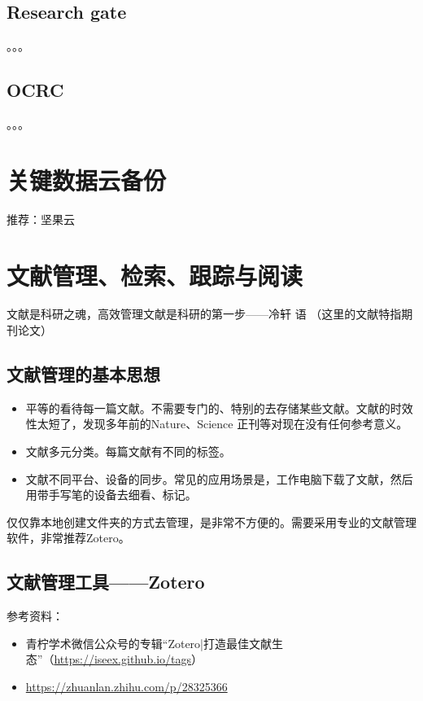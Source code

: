 \subsection{Research gate}
。。。

\subsection{OCRC}
。。。


\section{关键数据云备份}
推荐：坚果云



\section{文献管理、检索、跟踪与阅读}
文献是科研之魂，高效管理文献是科研的第一步——冷轩 \quad 语 （这里的文献特指期刊论文）



\subsection{文献管理的基本思想}
\begin{itemize}
\item 平等的看待每一篇文献。不需要专门的、特别的去存储某些文献。文献的时效性太短了，发现多年前的Nature、Science 正刊等对现在没有任何参考意义。

\item 文献多元分类。每篇文献有不同的标签。

\item 文献不同平台、设备的同步。常见的应用场景是，工作电脑下载了文献，然后用带手写笔的设备去细看、标记。
\end{itemize}
仅仅靠本地创建文件夹的方式去管理，是非常不方便的。需要采用专业的文献管理软件，非常推荐Zotero。





\subsection{文献管理工具——Zotero}
参考资料：
\begin{itemize}
\item 青柠学术微信公众号的专辑“Zotero|打造最佳文献生态”（\url{https://iseex.github.io/tags}）
\item \url{https://zhuanlan.zhihu.com/p/28325366}
\end{itemize}


